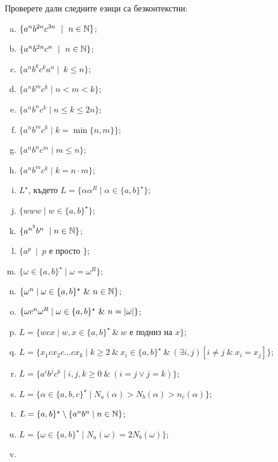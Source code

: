 \begin{problem}
  Проверете дали следните езици са безконтекстни:
  \begin{enumerate}[a)]
  \item
    $\{a^nb^{2n}c^{3n}\ \mid\ n\in\Nat\}$;
  \item
    $\{a^nb^{2n}c^{n}\ \mid\ n\in\Nat\}$;
  \item
    $\{a^nb^kc^ka^n\mid\ k \leq n\}$;
  \item
    $\{a^nb^mc^k\mid n < m < k\}$;
  \item
    $\{a^nb^nc^k\mid n \leq k \leq 2n\}$;
  \item
    $\{a^nb^mc^k\mid k = \min\{n,m\}\}$;
  \item
    $\{a^nb^nc^m\mid m \leq n\}$;
  \item
    $\{a^nb^mc^k\mid k = n\cdot m\}$;
  \item
    $L^\star$, където
    $L = \{\alpha\alpha^R \mid \alpha \in \{a,b\}^\star\}$;
  \item
    $\{www\mid w\in \{a,b\}^\star\}$;
  \item
    $\{a^{n^2}b^n\ \mid n \in \mathbb{N}\}$;
  \item
    $\{a^p\ \mid\ p\mbox{ е просто }\}$;
  \item
    $\{\omega \in \{a,b\}^\star \mid \omega = \omega^R\}$;
  \item
    $\{\omega^n \mid \omega \in \{a,b\}^\star\ \&\ n \in \mathbb{N}\}$;
  \item
    $\{\omega c^n \omega^R \mid \omega \in \{a,b\}^\star\ \&\ n = \lvert{\omega}\rvert\}$;
  \item
    $L = \{w c x\mid w,x\in \{a,b\}^\star\ \&\ w\mbox{ е подниз на }x\}$;
  \item
    $L = \{x_1 c x_2 c \dots c x_k\mid k\geq 2\ \&\ x_i\in\{a,b\}^\star\ \&\ (\exists i,j)[i \neq j\ \&\ x_i = x_j]\}$;
  \item
    $L = \{a^ib^jc^k\mid i,j,k\geq 0\ \&\ (i = j \vee j = k)\}$;
  \item
    $L = \{\alpha \in \{a,b,c\}^\star\mid N_a(\alpha) > N_b(\alpha) > n_c(\alpha)\}$;
  \item
    $L = \{a,b\}^\star \setminus \{a^nb^n\mid n\in \mathbb{N}\}$;
  \item
    $L = \{\omega \in \{a,b\}^\star \mid N_a(\omega) = 2N_b(\omega)\}$;
  \item

\end{enumerate}
\end{problem}
